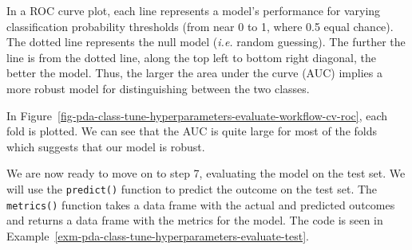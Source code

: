 \documentclass[
  letterpaper,
  DIV=11,
  numbers=noendperiod]{scrreprt}
\theoremstyle{definition}
\theoremstyle{remark}
\begin{document}
In a ROC curve plot, each line represents a model's performance for
varying classification probability thresholds (from near 0 to 1, where
0.5 equal chance). The dotted line represents the null model
(\emph{i.e.} random guessing). The further the line is from the dotted
line, along the top left to bottom right diagonal, the better the model.
Thus, the larger the area under the curve (AUC) implies a more robust
model for distinguishing between the two classes.

In
Figure~\ref{fig-pda-class-tune-hyperparameters-evaluate-workflow-cv-roc},
each fold is plotted. We can see that the AUC is quite large for most of
the folds which suggests that our model is robust.

We are now ready to move on to step 7, evaluating the model on the test
set. We will use the \texttt{predict()} function to predict the outcome
on the test set. The \texttt{metrics()} function takes a data frame with
the actual and predicted outcomes and returns a data frame with the
metrics for the model. The code is seen in
Example~\ref{exm-pda-class-tune-hyperparameters-evaluate-test}.
\end{document}
